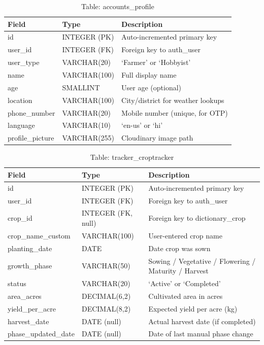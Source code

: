 \documentclass[12pt,a4paper]{article}
\begin{document}
\begin{table}[h]
\caption{Table: accounts\_profile}
\centering
\begin{tabular}{|l|l|p{6cm}|}
\hline
\textbf{Field} & \textbf{Type} & \textbf{Description} \\ \hline
id & INTEGER (PK) & Auto-incremented primary key \\ \hline
user\_id & INTEGER (FK) & Foreign key to auth\_user \\ \hline
user\_type & VARCHAR(20) & `Farmer' or `Hobbyist' \\ \hline
name & VARCHAR(100) & Full display name \\ \hline
age & SMALLINT & User age (optional) \\ \hline
location & VARCHAR(100) & City/district for weather lookups \\ \hline
phone\_number & VARCHAR(20) & Mobile number (unique, for OTP) \\ \hline
language & VARCHAR(10) & `en-us' or `hi' \\ \hline
profile\_picture & VARCHAR(255) & Cloudinary image path \\ \hline
\end{tabular}
\end{table}

\begin{table}[h]
\caption{Table: tracker\_croptracker}
\centering
\begin{tabular}{|l|l|p{5.5cm}|}
\hline
\textbf{Field} & \textbf{Type} & \textbf{Description} \\ \hline
id & INTEGER (PK) & Auto-incremented primary key \\ \hline
user\_id & INTEGER (FK) & Foreign key to auth\_user \\ \hline
crop\_id & INTEGER (FK, null) & Foreign key to dictionary\_crop \\ \hline
crop\_name\_custom & VARCHAR(100) & User-entered crop name \\ \hline
planting\_date & DATE & Date crop was sown \\ \hline
growth\_phase & VARCHAR(50) & Sowing / Vegetative / Flowering / Maturity / Harvest \\ \hline
status & VARCHAR(20) & `Active' or `Completed' \\ \hline
area\_acres & DECIMAL(6,2) & Cultivated area in acres \\ \hline
yield\_per\_acre & DECIMAL(8,2) & Expected yield per acre (kg) \\ \hline
harvest\_date & DATE (null) & Actual harvest date (if completed) \\ \hline
phase\_updated\_date & DATE (null) & Date of last manual phase change \\ \hline
\end{tabular}
\end{table}
\end{document}
